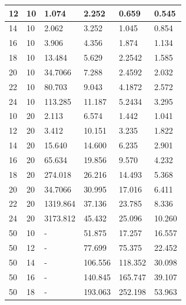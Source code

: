\documentclass[a4paper, 12pt]{book}
\begin{document}
\begin{table}[h!]
\begin{center}
{\begin{tabular}{ l| l | l | l | l | l }
	12             & 10         & 1.074       & 2.252     & 0.659     & 0.545        \\ \hline
	14             & 10         &	2.062       & 3.252     & 1.045     & 0.854        \\ \hline
	16             & 10         & 3.906       & 4.356     & 1.874     & 1.134        \\ \hline
	18             & 10         & 13.484      & 5.629     & 2.2542    & 1.585        \\ \hline
	20             & 10         & 34.7066     & 7.288     & 2.4592    & 2.032        \\ \hline
	22             & 10         & 80.703      & 9.043     & 4.1872    & 2.572        \\ \hline
	24             & 10         & 113.285     & 11.187    & 5.2434    & 3.295        \\ \hline
	\hline
	10             & 20         & 2.113       & 6.574     & 1.442     & 1.041        \\ \hline
	12             & 20         & 3.412       & 10.151    & 3.235     & 1.822        \\ \hline
	14             & 20         &	15.640      & 14.600     & 6.235     & 2.901        \\ \hline
	16             & 20         & 65.634      & 19.856    & 9.570     & 4.232        \\ \hline
	18             & 20         & 274.018     & 26.216    & 14.493    & 5.368        \\ \hline
	20             & 20         & 34.7066     & 30.995    & 17.016    & 6.411        \\ \hline
	22             & 20         & 1319.864    & 37.136    & 23.785    & 8.336        \\ \hline
	24             & 20         & 3173.812    & 45.432    & 25.096    & 10.260       \\ \hline
	\hline
	50             & 10         & -           & 51.875    & 17.257    & 16.557      \\ \hline
	50             & 12         & -           & 77.699    & 75.375    & 22.452      \\ \hline
	50             & 14         & -           & 106.556   & 118.352   & 30.098      \\ \hline
	50             & 16         & -           & 140.845   & 165.747   & 39.107      \\ \hline
	50             & 18         & -           & 193.063   & 252.198   & 53.963      \\ \hline

\end{tabular}}
\end{center}
\end{table}
\end{document}
